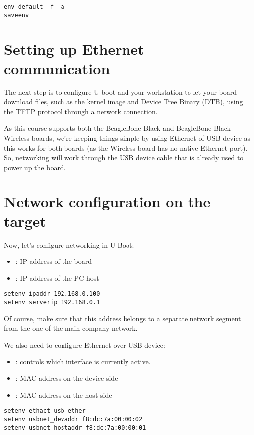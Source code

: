 \begin{verbatim}
env default -f -a
saveenv
\end{verbatim}

\section{Setting up Ethernet communication}

The next step is to configure U-boot and your workstation to let your
board download files, such as the kernel image and Device Tree Binary
(DTB), using the TFTP protocol through a network connection.

As this course supports both the BeagleBone Black and BeagleBone Black
Wireless boards, we're keeping things simple by using Ethernet of USB
device as this works for both boards (as the Wireless board has no
native Ethernet port). So, networking will work through the USB device
cable that is already used to power up the board.

\section{Network configuration on the target}
Now, let's configure networking in U-Boot:

\begin{itemize}
  \item {}: IP address of the board
  \item {}: IP address of the PC host
\end{itemize}

\begin{verbatim}
setenv ipaddr 192.168.0.100
setenv serverip 192.168.0.1
\end{verbatim}

Of course, make sure that this address belongs to a separate network
segment from the one of the main company network.

We also need to configure Ethernet over USB device:
\begin{itemize}
  \item {}: controls which interface is currently active.
  \item {}: MAC address on the device side
  \item {}: MAC address on the host side  
\end{itemize}

\begin{verbatim}
setenv ethact usb_ether
setenv usbnet_devaddr f8:dc:7a:00:00:02
setenv usbnet_hostaddr f8:dc:7a:00:00:01
\end{verbatim}

